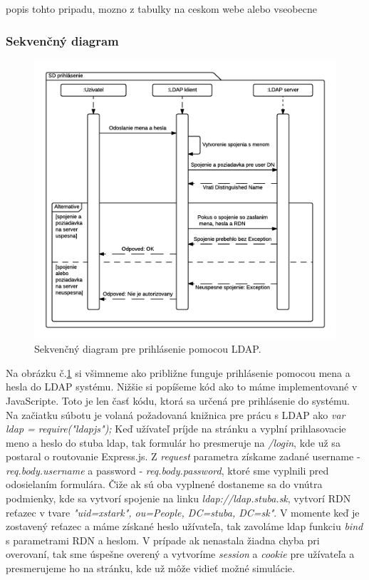 popis tohto pripadu, mozno z tabulky na ceskom webe alebo vseobecne


\subsubsection{Sekvenčný diagram}

\begin{figure}[H]
  \centering
  \includegraphics[scale=0.7]{img/diagrams/sequence-ldap.png}
  \caption{Sekvenčný diagram pre prihlásenie pomocou LDAP.}
  \label{img-sequence-ldap-login}
\end{figure}

Na obrázku č.\ref{img-sequence-ldap-login} si všimneme ako približne funguje prihlásenie pomocou mena a hesla do LDAP systému. Nižšie si popíšeme kód ako to máme implementované v JavaScripte. Toto je len časť kódu, ktorá sa určená pre prihlásenie do systému. Na začiatku súbotu je volaná požadovaná knižnica pre prácu s LDAP ako \textit{var ldap = require("ldapjs");}
Keď užívateľ príjde na stránku a vyplní prihlasovacie meno a heslo do stuba ldap, tak formulár ho presmeruje na \textit{/login}, kde už sa postaral o routovanie Express.js. Z \textit{request} parametra získame zadané username - \textit{req.body.username} a password - \textit{req.body.password}, ktoré sme vyplnili pred odosielaním formulára. Čiže ak sú oba vyplnené dostaneme sa do vnútra podmienky, kde sa vytvorí spojenie na linku \textit{ldap://ldap.stuba.sk}, vytvorí RDN reťazec v tvare \textit{"uid=xstark", ou=People, DC=stuba, DC=sk"}.
V momente keď je zostavený reťazec a máme získané heslo užívateľa, tak zavoláme ldap funkciu \textit{bind} s parametrami RDN a heslom. V prípade ak nenastala žiadna chyba pri overovaní, tak sme úspešne overený a vytvoríme \textit{session} a \textit{cookie} pre užívateľa a presmerujeme ho na stránku, kde už môže vidieť možné simulácie.

